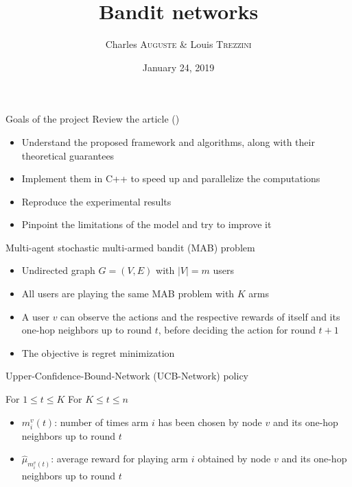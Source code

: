 \documentclass{beamer}
\title{Bandit networks}
\date{January 24, 2019}
\author{Charles \textsc{Auguste} \& Louis \textsc{Trezzini}}
\begin{document}
\maketitle

\begin{frame}{Goals of the project}
Review the article  (\citeauthor{DBLP:journals/corr/KollaJG16})

\begin{itemize}
  \item Understand the proposed framework and algorithms, along with their theoretical guarantees
  \item Implement them in C++ to speed up and parallelize the computations
  \item Reproduce the experimental results
  \item Pinpoint the limitations of the model and try to improve it
\end{itemize}
\end{frame}

\begin{frame}{Multi-agent stochastic multi-armed bandit (MAB) problem}
\begin{itemize}
  \item Undirected graph $G = (V, E)$ with $|V| = m$ users
  \item All users are playing the \alert{same} MAB problem with $K$ arms
  \item A user $v$ can observe the actions and the respective rewards of itself and its \alert{one-hop neighbors up to round $t$}, before deciding the action for round $t + 1$
  \item The objective is \alert{regret minimization}
\end{itemize}

\end{frame}

\begin{frame}{Upper-Confidence-Bound-Network (UCB-Network) policy}
  \begin{algorithm}[H]
    \caption{Upper-Confidence-Bound-Network (UCB-Network)}
    \begin{algorithmic}
        For $1 \leq t \leq K$
        For $K \leq t \leq n$
    \end{algorithmic}
  \end{algorithm}

  \begin{itemize}
    \item $m^v_i(t)$: number of times arm $i$ has been chosen by node $v$ and its one-hop neighbors up to round $t$
    \item $\hat{\mu}_{m_i^v(t)}$: average reward for playing arm $i$ obtained by node $v$ and its one-hop neighbors up to round $t$
  \end{itemize}
\end{frame}
\end{document}
